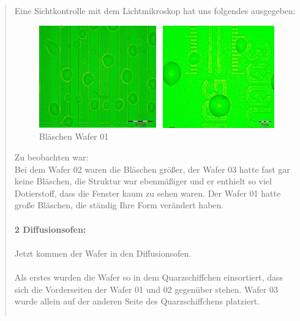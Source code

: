 \begin{quote}
        \vspace{2em}

		Eine Sichtkontrolle mit dem Lichtmikroskop hat uns folgendes ausgegeben:

     	\vspace{2em}

    		\begin{figure}[H]
				\hspace{3.5 cm}
                \includegraphics[scale=0.5, trim = 0cm 0cm 0cm 0cm,clip]
                	{./HerstellungBilder/Mikroskopbild2.png}
                  \caption{Bläschen Wafer 01}
                \label{fig:blaes}
            \end{figure}

     	\vspace{2em}

    	Zu beobachten war:\\
		Bei dem Wafer 02 waren die Bläschen größer, der Wafer 03 hatte fast gar
		keine Bläschen, die Struktur war ebenmäßiger und er enthielt so viel
		Dotierstoff, dass die Fenster kaum zu sehen waren. Der Wafer 01 hatte
		große Bläschen, die ständig Ihre Form verändert haben.\\
		\\
		\textbf{2 Diffusionsofen:}\\
		\\
		Jetzt kommen der Wafer in den Diffusionsofen.\\
		\\
		Als erstes wurden die Wafer so in dem Quarzschiffchen einsortiert, dass
		sich die Vorderseiten der Wafer 01 und 02 gegenüber stehen. Wafer 03
		wurde allein auf der anderen Seite des Quarzschiffchens platziert.

		\vspace{2em}

    	\begin{center}
                \begin{tabular}{ll}


\end{tabular}
\end{center}
\end{quote}
